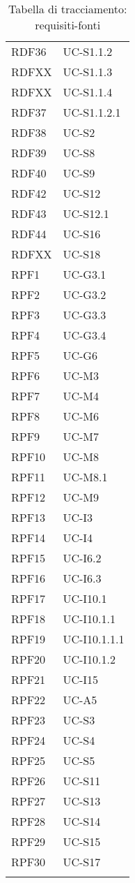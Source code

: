\begin{longtable}{| p{5cm} | p{5cm} |}
		\rowcolor{LightGray}
		RDF36 & UC-S1.1.2\\
		RDFXX & UC-S1.1.3\\%
		RDFXX & UC-S1.1.4\\		%
		RDF37 & UC-S1.1.2.1 \\
		\rowcolor{LightGray}
		RDF38 & UC-S2\\
		RDF39 & UC-S8\\
		\rowcolor{LightGray}
		RDF40 & UC-S9\\
		\rowcolor{LightGray}
		RDF42 & UC-S12 \\
		RDF43 & UC-S12.1 \\
		\rowcolor{LightGray}
		RDF44 & UC-S16\\
		RDFXX & UC-S18\\		%
		RPF1 & UC-G3.1\\
		\rowcolor{LightGray}
		RPF2 & UC-G3.2\\
		RPF3 & UC-G3.3\\
		\rowcolor{LightGray}
		RPF4 & UC-G3.4\\
		RPF5 & UC-G6\\
		\rowcolor{LightGray}
		RPF6 & UC-M3\\
		RPF7 & UC-M4\\
		\rowcolor{LightGray}
		RPF8 & UC-M6\\
		RPF9 & UC-M7\\
		\rowcolor{LightGray}
		RPF10 & UC-M8\\
		RPF11 & UC-M8.1\\
		\rowcolor{LightGray}
		RPF12 & UC-M9\\
		RPF13 & UC-I3\\
		\rowcolor{LightGray}
		RPF14 & UC-I4\\
		RPF15 & UC-I6.2\\
		\rowcolor{LightGray}
		RPF16 & UC-I6.3\\
		RPF17 & UC-I10.1\\
		\rowcolor{LightGray}
		RPF18 & UC-I10.1.1\\
		RPF19 & UC-I10.1.1.1\\
		\rowcolor{LightGray}
		RPF20 & UC-I10.1.2\\		
		RPF21 & UC-I15\\
		\rowcolor{LightGray}
		RPF22 & UC-A5\\
		RPF23 & UC-S3\\
		\rowcolor{LightGray}
		RPF24 & UC-S4\\
		RPF25 & UC-S5\\
		\rowcolor{LightGray}
		RPF26 & UC-S11\\
		RPF27 & UC-S13\\
		\rowcolor{LightGray}
		RPF28 & UC-S14\\	
		RPF29 & UC-S15\\
		\rowcolor{LightGray}
		RPF30 & UC-S17\\
		\hline
		\caption{Tabella di tracciamento: requisiti-fonti}
\end{longtable}

